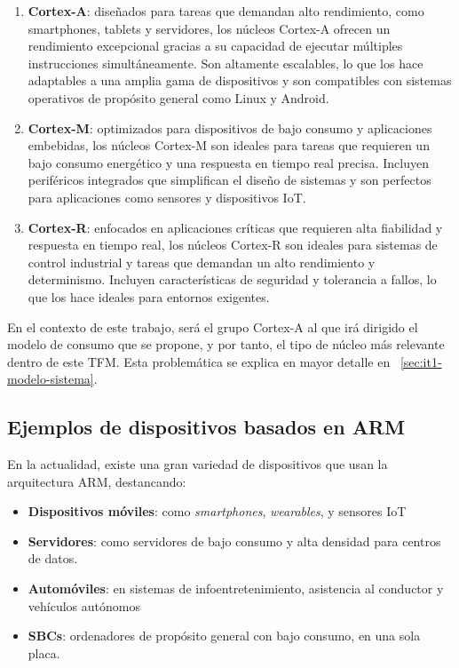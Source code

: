 \begin{enumerate}
    \item \textbf{Cortex-A}: diseñados para tareas que demandan alto rendimiento, como smartphones, tablets y servidores, los núcleos Cortex-A ofrecen un rendimiento excepcional gracias a su capacidad de ejecutar múltiples instrucciones simultáneamente. Son altamente escalables, lo que los hace adaptables a una amplia gama de dispositivos y son compatibles con sistemas operativos de propósito general como Linux y Android.

    \item \textbf{Cortex-M}: optimizados para dispositivos de bajo consumo y aplicaciones embebidas, los núcleos Cortex-M son ideales para tareas que requieren un bajo consumo energético y una respuesta en tiempo real precisa. Incluyen periféricos integrados que simplifican el diseño de sistemas y son perfectos para aplicaciones como sensores y dispositivos \ac{IoT}.

    \item \textbf{Cortex-R}: enfocados en aplicaciones críticas que requieren alta fiabilidad y respuesta en tiempo real, los núcleos Cortex-R son ideales para sistemas de control industrial y tareas que demandan un alto rendimiento y determinismo. Incluyen características de seguridad y tolerancia a fallos, lo que los hace ideales para entornos exigentes.
\end{enumerate}

En el contexto de este trabajo, será el grupo Cortex-A al que irá dirigido el modelo de consumo que se propone, y por tanto, el tipo de núcleo más relevante dentro de este \ac{TFM}. Esta problemática se explica en mayor detalle en ~\ref{sec:it1-modelo-sistema}.

\subsection{Ejemplos de dispositivos basados en \ac{ARM}}

En la actualidad, existe una gran variedad de dispositivos que usan la arquitectura \ac{ARM}, destancando:

\begin{itemize}
    \item \textbf{Dispositivos móviles}: como \textit{smartphones}, \textit{wearables}, y sensores \ac{IoT}
    \item \textbf{Servidores}: como servidores de bajo consumo y alta densidad para centros de datos.
    \item \textbf{Automóviles}: en sistemas de infoentretenimiento, asistencia al conductor y vehículos autónomos
    \item \textbf{\ac{SBC}s}: ordenadores de propósito general con bajo consumo, en una sola placa.
\end{itemize}

